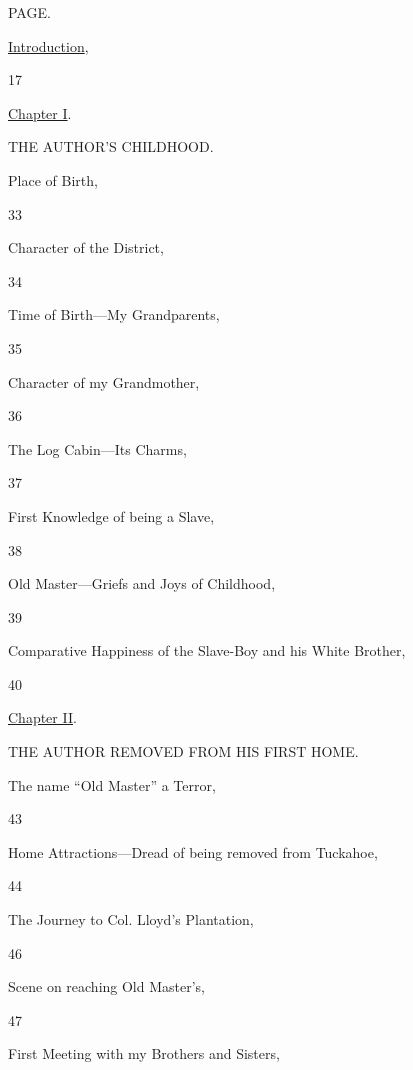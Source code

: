 {\protect\hypertarget{x}{}{}}

{\protect\hypertarget{xi}{}{}}

{\protect\hypertarget{xii}{}{}}

{\protect\hypertarget{xiii}{}{}}

{\protect\hypertarget{xiv}{}{}}

{\protect\hypertarget{xv}{}{}}

{\protect\hypertarget{xvi}{}{}}

PAGE.

\href{/wiki/My_Bondage_and_My_Freedom_(1855)/Introduction}{Introduction},

17

\href{/wiki/My_Bondage_and_My_Freedom_(1855)/Chapter_I}{Chapter I}.

THE AUTHOR'S CHILDHOOD.

Place of Birth,

33

Character of the District,

34

Time of Birth---My Grandparents,

35

Character of my Grandmother,

36

The Log Cabin---Its Charms,

37

First Knowledge of being a Slave,

38

Old Master---Griefs and Joys of Childhood,

39

Comparative Happiness of the Slave-Boy and his White Brother,

40

\href{/wiki/My_Bondage_and_My_Freedom_(1855)/Chapter_II}{Chapter II}.

THE AUTHOR REMOVED FROM HIS FIRST HOME.

The name ``Old Master'' a Terror,

43

Home Attractions---Dread of being removed from Tuckahoe,

44

The Journey to Col. Lloyd's Plantation,

46

Scene on reaching Old Master's,

47

First Meeting with my Brothers and Sisters,

